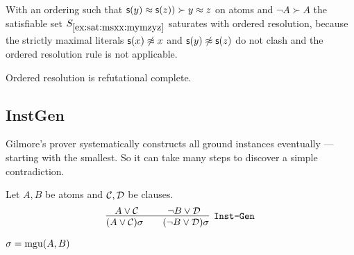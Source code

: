 \begin{example}
	With an ordering such that \( \mathsf{s}(y)\approx\mathsf{s}(z)) \succ y\approx z \) on atoms and \( {\lnot A} \succ A \)
	the satisfiable set \( S_{\ref{ex:sat:msxx:mymzyz}} \) saturates with ordered resolution,
	because the strictly maximal literals
	\( \mathsf{s}(x)\not\approx x \) and
	\( \mathsf{s}(y)\not\approx\mathsf{s}(z) \)
	do not clash and the ordered resolution rule is not applicable.
\end{example}



\begin{lemma}
	Ordered resolution is refutational complete.
\end{lemma}




\subsection{InstGen}\label{sec:inst:gen}

Gilmore's prover systematically constructs all ground instances eventually --- starting with the smallest. So it can take many steps to discover a simple contradiction.

\begin{definition} Let \( A, B \) be atoms and \( \mathcal{C},\mathcal{D} \) be clauses.
	\begin{gather*}
	\infer
	[{\InstGen}]
	{(A\lor\mathcal C)\sigma\qquad (\lnot B\lor\mathcal D)\sigma}
	{A\lor\mathcal C\quad&\quad \lnot B\lor\mathcal D}
	\end{gather*}
	\begin{center}\( \sigma=\operatorname{mgu}(A,B) \)
	\end{center}
\end{definition}

